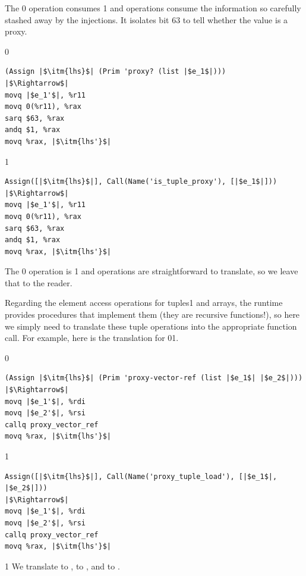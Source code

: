 \documentclass[7x10]{TimesAPriori_MIT}%
\def\racketEd{0}
\def\pythonEd{1}
\def\edition{1}
\newcommand{\racket}[1]{{\if\edition\racketEd{#1}\fi}}
\newcommand{\pythonColor}[0]{}
\newcommand{\python}[1]{{\if\edition\pythonEd\pythonColor #1\fi}}
\numberwithin{theorem}{chapter}
\numberwithin{definition}{chapter}
\numberwithin{equation}{chapter}
\begin{document}
The \racket{ operation consumes}%
\python{ and  operations
  consume}
the information so carefully stashed away by the injections.  It
isolates bit $63$ to tell whether the value is a proxy.
%
{\if\edition\racketEd
\begin{lstlisting}
(Assign |$\itm{lhs}$| (Prim 'proxy? (list |$e_1$|)))
|$\Rightarrow$|
movq |$e_1'$|, %r11
movq 0(%r11), %rax
sarq $63, %rax
andq $1, %rax
movq %rax, |$\itm{lhs'}$|
\end{lstlisting}
\fi}%
%
{\if\edition\pythonEd\pythonColor
\begin{lstlisting}
Assign([|$\itm{lhs}$|], Call(Name('is_tuple_proxy'), [|$e_1$|]))
|$\Rightarrow$|
movq |$e_1'$|, %r11
movq 0(%r11), %rax
sarq $63, %rax
andq $1, %rax
movq %rax, |$\itm{lhs'}$|
\end{lstlisting}
\fi}%
%
The \racket{ operation is}
\python{ and  operations are}
straightforward to translate, so we leave that to the reader.

Regarding the element access operations for tuples\python{ and arrays}, the
runtime provides procedures that implement them (they are recursive
functions!), so here we simply need to translate these tuple
operations into the appropriate function call. For example, here is
the translation for
\racket{}\python{}.

{\if\edition\racketEd
\begin{minipage}{0.96\textwidth}
\begin{lstlisting}
(Assign |$\itm{lhs}$| (Prim 'proxy-vector-ref (list |$e_1$| |$e_2$|)))
|$\Rightarrow$|
movq |$e_1'$|, %rdi
movq |$e_2'$|, %rsi
callq proxy_vector_ref
movq %rax, |$\itm{lhs'}$|
\end{lstlisting}
\end{minipage}
\fi}
{\if\edition\pythonEd\pythonColor
\begin{lstlisting}
Assign([|$\itm{lhs}$|], Call(Name('proxy_tuple_load'), [|$e_1$|, |$e_2$|]))
|$\Rightarrow$|
movq |$e_1'$|, %rdi
movq |$e_2'$|, %rsi
callq proxy_vector_ref
movq %rax, |$\itm{lhs'}$|
\end{lstlisting}
\fi}

{\if\edition\pythonEd\pythonColor
We translate 
 to ,
 to , and
 to .
\fi}
\end{document}
